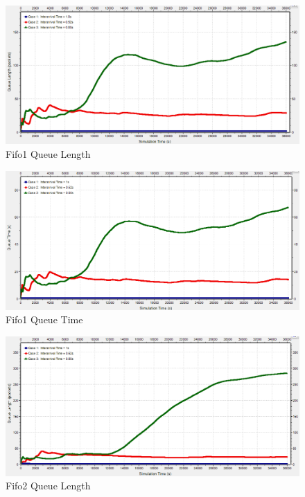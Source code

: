 \documentclass{article}
\begin{document}
\begin{figure}[h!]
	\begin{center}
	\includegraphics[scale=0.65]{Images/Fifo1_QueueLength.PNG}
	\vspace{-.25cm}
	\caption{Fifo1 Queue Length}
	\label{fifo1_qlen}
	\end{center}
\end{figure}

\begin{figure}[h!]
	\begin{center}
	\includegraphics[scale=0.65]{Images/Fifo1_QueueTime.PNG}
	\vspace{-.25cm}
	\caption{Fifo1 Queue Time}
	\label{fifo1_qtime}
	\end{center}
\end{figure}

\begin{figure}[h!]
	\begin{center}
	\includegraphics[scale=0.65]{Images/Fifo2_QueueLength.PNG}
	\vspace{-.25cm}
	\caption{Fifo2 Queue Length}
	\label{fifo2_qlen}
	\end{center}
\end{figure}
\end{document}
